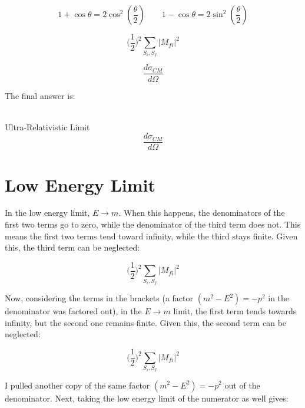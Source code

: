 \documentclass[a4]{article}
\begin{document}
    \begin{equation}
        1 + \cos \theta = 2 \cos^2 (\frac{\theta}{2}) \qquad 1 - \cos \theta = 2 \sin^2 (\frac{\theta}{2})
    \end{equation}

    \begin{equation}
        \Big( \frac{1}{2} \Big)^2 \sum_{S_i, S_f} |M_{f i}|^2
    \end{equation}

    \begin{equation}
        \frac{d \sigma_{CM}}{d \Omega}
    \end{equation}

    The final answer is:

    \begin{framed}
         \\
        Ultra-Relativistic Limit
        \begin{equation}
            \frac{d \sigma_{CM}}{d \Omega}
        \end{equation}
    \end{framed}

    \section*{Low Energy Limit}

    In the low energy limit, $E \rightarrow m$. When this happens, the denominators of the first two terms go to zero, while the denominator of the third term
    does not. This means the first two terms tend toward infinity, while the third stays finite. Given this, the third term can be neglected:

    \begin{equation}
        \Big( \frac{1}{2} \Big)^2 \sum_{S_i, S_f} |M_{f i}|^2
    \end{equation}

    Now, considering the terms in the brackets (a factor $(m^2 - E^2) = - p^2$ in the denominator was factored out), in the $E \rightarrow m$ limit, the first
    term tends towards infinity, but the second one remains finite. Given this, the second term can be neglected:

    \begin{equation}
        \Big( \frac{1}{2} \Big)^2 \sum_{S_i, S_f} |M_{f i}|^2
    \end{equation}

    I pulled another copy of the same factor $(m^2 - E^2) = - p^2$ out of the denominator. Next, taking the low energy limit of the numerator as well gives:
\end{document}
